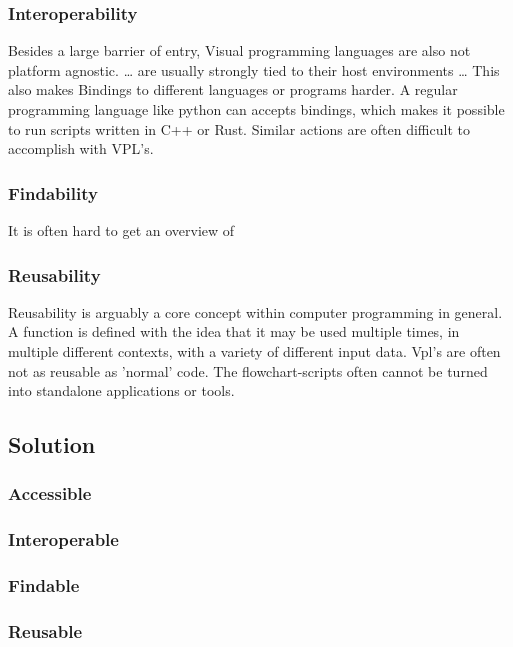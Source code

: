 \subsubsection*{Interoperability}
Besides a large barrier of entry, Visual programming languages are also not platform agnostic. 
\dots
are usually strongly tied to their host environments
\dots
This also makes Bindings to different languages or programs harder. A regular programming language like python can accepts bindings, which makes it possible to run scripts written in C++ or Rust. Similar actions are often difficult to accomplish with VPL's.

\subsubsection*{Findability}
It is often hard to get an overview of 


\subsubsection*{Reusability}
Reusability is arguably a core concept within computer programming in general. 
A function is defined with the idea that it may be used multiple times, in multiple different contexts, with a variety of different input data.
Vpl's are often not as reusable as 'normal' code. The flowchart-scripts often cannot be turned into standalone applications or tools.



\newpage
\subsection{Solution}


\subsubsection*{Accessible}


\subsubsection*{Interoperable}



\subsubsection*{Findable}


\subsubsection*{Reusable}


